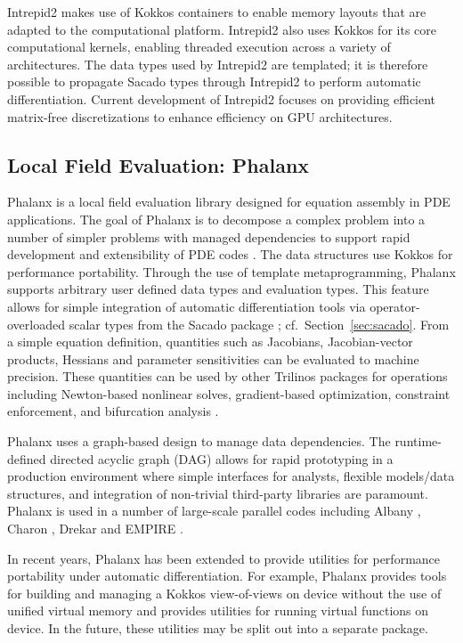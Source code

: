 Intrepid2 makes use of Kokkos containers to enable memory layouts that are adapted to the computational platform. Intrepid2 also uses Kokkos for its core computational kernels, enabling threaded execution across a variety of architectures. The data types used by Intrepid2 are templated; it is therefore possible to propagate Sacado types through Intrepid2 to perform automatic differentiation. Current development of Intrepid2 focuses on providing efficient matrix-free discretizations to enhance efficiency on GPU architectures. 

\subsection{Local Field Evaluation: Phalanx}
Phalanx is a local field evaluation library designed for equation assembly in PDE applications. The goal of Phalanx is to decompose a complex problem into a number of simpler problems with managed dependencies to support rapid development and extensibility of PDE codes \cite{Notz2012,pawlowski2012automating,pawlowski2012automatingpart2}. The data structures use Kokkos \cite{trott2021kokkos} for performance portability. Through the use of template metaprogramming, Phalanx supports arbitrary user defined data types and evaluation types. This feature allows for simple integration of automatic differentiation tools via operator-overloaded scalar types from the Sacado package \cite{phipps2022automatic}; cf.~Section~\ref{sec:sacado}. From a simple equation definition, quantities such as Jacobians, Jacobian-vector products, Hessians and parameter sensitivities can be evaluated to machine precision. These quantities can be used by other Trilinos packages for operations including Newton-based nonlinear solves, gradient-based optimization, constraint enforcement, and bifurcation analysis \cite{pawlowski2012automating,pawlowski2012automatingpart2}.

Phalanx uses a graph-based design to manage data dependencies. The runtime-defined directed acyclic graph (DAG) allows for rapid prototyping in a production environment where simple interfaces for analysts, flexible models/data structures, and integration of non-trivial third-party libraries are paramount. Phalanx is used in a number of large-scale parallel codes including Albany \cite{Salinger2016}, Charon \cite{CharonUsersManual2020}, Drekar \cite{Crockatt2022,Miller2019,Shadid2016mhd} and EMPIRE \cite{BettencourtBrownEtAl2021_EmpirePic}.

In recent years, Phalanx has been extended to provide utilities for performance portability under automatic differentiation. For example, Phalanx provides tools for building and managing a Kokkos view-of-views on device without the use of unified virtual memory and provides utilities for running virtual functions on device. In the future, these utilities may be split out into a separate package.

